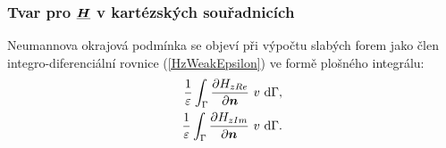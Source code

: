 \documentclass[12pt,a4paper,oneside]{article}
\numberwithin{equation}{section} %
\numberwithin{figure}{section} %
\numberwithin{table}{section} %
\renewcommand{\vec}[1]{\mbox{\boldmath$#1$}} %
\newcommand{\faz}[1]{{\underline{#1}}} %
\begin{document}
\subsubsection*{Tvar pro $\faz{\vec{H}}$ v kartézských souřadnicích}
\label{NeumannHK}
Neumannova okrajová podmínka se objeví při výpočtu slabých forem jako člen integro-diferenciální rovnice (\ref{HzWeakEpsilon}) ve formě plošného integrálu:
\begin{subequations}
\label{Hweakneumann}
\begin{align}
\frac{1}{\varepsilon} \int _{\Gamma} \frac{\partial H _{z Re}}{\partial \vec{n}} ~ v ~ \ud \Gamma ,
\\ 
\frac{1}{\varepsilon} \int _{\Gamma} \frac{\partial H _{z Im}}{\partial \vec{n}} ~ v ~ \ud \Gamma .
\end{align}
\end{subequations}
\end{document}
